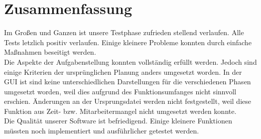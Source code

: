 

\chapter{Zusammenfassung}

Im Großen und Ganzen ist unsere Testphase zufrieden stellend verlaufen. 
Alle Tests letzlich positiv verlaufen. Einige kleinere Probleme konnten durch einfache Maßnahmen beseitigt werden.\\
Die Aspekte der Aufgabenstellung konnten vollständig erfüllt werden. Jedoch sind einige Kriterien der ursprünglichen Planung anders umgesetzt worden.
In der GUI ist sind keine unterschiedlichen Darstellungen für die verschiedenen Phasen umgesetzt worden, weil dies aufgrund des Funktionsumfanges nicht sinnvoll erschien. Änderungen an der Ursprungsdatei werden nicht festgestellt, weil diese Funktion aus Zeit- bzw. Mitarbeitermangel nicht umgesetzt werden konnte.\\
Die Qualität unserer Software ist befriedigend. Einige kleinere Funktionen müssten noch implementiert und ausführlicher getestet werden.